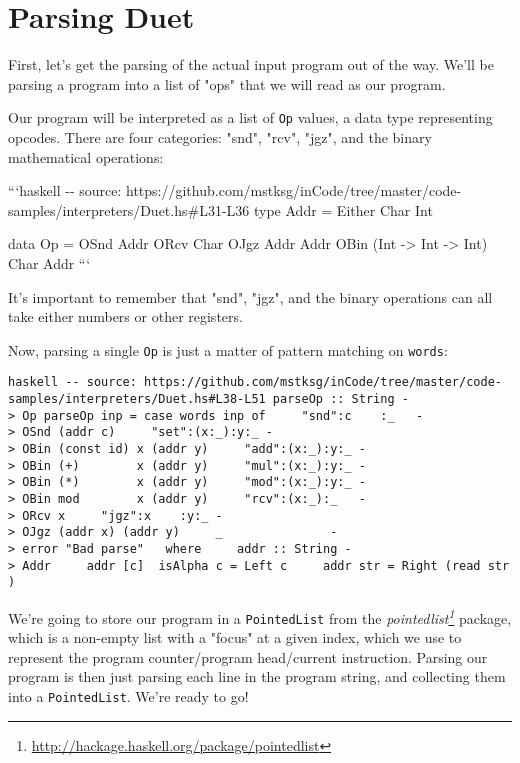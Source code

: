 \documentclass[]{article}
\renewcommand{\href}[2]{#2\footnote{\url{#1}}}
\begin{document}
\section{Parsing Duet}

First, let's get the parsing of the actual input program out of the way. We'll
be parsing a program into a list of "ops" that we will read as our program.

Our program will be interpreted as a list of \texttt{Op} values, a data type
representing opcodes. There are four categories: "snd", "rcv", "jgz", and the
binary mathematical operations:

```haskell -\/- source:
https://github.com/mstksg/inCode/tree/master/code-samples/interpreters/Duet.hs\#L31-L36
type Addr = Either Char Int

data Op = OSnd Addr \textbar{} ORcv Char \textbar{} OJgz Addr Addr \textbar{}
OBin (Int -\textgreater{} Int -\textgreater{} Int) Char Addr ```

It's important to remember that "snd", "jgz", and the binary operations can all
take either numbers or other registers.

Now, parsing a single \texttt{Op} is just a matter of pattern matching on
\texttt{words}:

\texttt{haskell\ -\/-\ source:\ https://github.com/mstksg/inCode/tree/master/code-samples/interpreters/Duet.hs\#L38-L51\ parseOp\ ::\ String\ -\textgreater{}\ Op\ parseOp\ inp\ =\ case\ words\ inp\ of\ \ \ \ \ "snd":c\ \ \ \ :\_\ \ \ -\textgreater{}\ OSnd\ (addr\ c)\ \ \ \ \ "set":(x:\_):y:\_\ -\textgreater{}\ OBin\ (const\ id)\ x\ (addr\ y)\ \ \ \ \ "add":(x:\_):y:\_\ -\textgreater{}\ OBin\ (+)\ \ \ \ \ \ \ \ x\ (addr\ y)\ \ \ \ \ "mul":(x:\_):y:\_\ -\textgreater{}\ OBin\ (*)\ \ \ \ \ \ \ \ x\ (addr\ y)\ \ \ \ \ "mod":(x:\_):y:\_\ -\textgreater{}\ OBin\ mod\ \ \ \ \ \ \ \ x\ (addr\ y)\ \ \ \ \ "rcv":(x:\_):\_\ \ \ -\textgreater{}\ ORcv\ x\ \ \ \ \ "jgz":x\ \ \ \ :y:\_\ -\textgreater{}\ OJgz\ (addr\ x)\ (addr\ y)\ \ \ \ \ \_\ \ \ \ \ \ \ \ \ \ \ \ \ \ \ -\textgreater{}\ error\ "Bad\ parse"\ \ \ where\ \ \ \ \ addr\ ::\ String\ -\textgreater{}\ Addr\ \ \ \ \ addr\ {[}c{]}\ \textbar{}\ isAlpha\ c\ =\ Left\ c\ \ \ \ \ addr\ str\ =\ Right\ (read\ str)}

We're going to store our program in a \texttt{PointedList} from the
\emph{\href{http://hackage.haskell.org/package/pointedlist}{pointedlist}}
package, which is a non-empty list with a "focus" at a given index, which we use
to represent the program counter/program head/current instruction. Parsing our
program is then just parsing each line in the program string, and collecting
them into a \texttt{PointedList}. We're ready to go!
\end{document}
